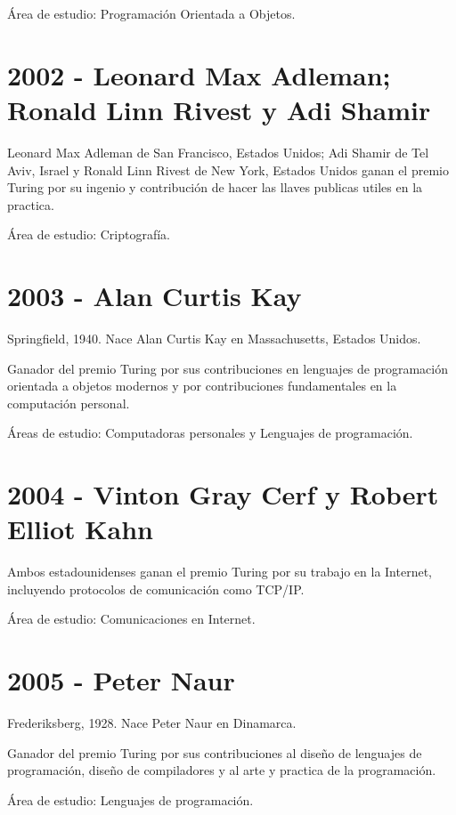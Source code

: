 \documentclass[notitlepage,letterpaper, 11pt]{article}
\begin{document}
\noindent Área de estudio: Programación Orientada a Objetos.
\newline

\section*{2002 - Leonard Max Adleman; Ronald Linn Rivest y Adi Shamir}
\noindent Leonard Max Adleman de San Francisco, Estados Unidos; Adi Shamir de Tel Aviv, Israel y  Ronald Linn Rivest de New York, Estados Unidos  ganan el premio Turing por su ingenio y contribución de hacer las llaves publicas utiles en la practica.

\noindent Área de estudio: Criptografía.
\newline

\section*{2003 - Alan Curtis Kay}
\noindent Springfield, 1940. Nace Alan Curtis Kay en Massachusetts, Estados Unidos.

\noindent Ganador del premio Turing por sus contribuciones en lenguajes de programación orientada a objetos modernos y por contribuciones fundamentales en la computación personal.

\noindent Áreas de estudio: Computadoras personales y Lenguajes de programación.
\newline

\section*{2004 - Vinton Gray Cerf y Robert Elliot Kahn}
\noindent Ambos estadounidenses  ganan el premio Turing por su trabajo en la Internet, incluyendo protocolos de comunicación como TCP/IP.

\noindent Área de estudio: Comunicaciones en Internet.
\newline

\section*{2005 - Peter Naur}
\noindent Frederiksberg, 1928. Nace Peter Naur en Dinamarca.

\noindent Ganador del premio Turing por sus contribuciones al diseño de lenguajes de programación, diseño de compiladores y al arte y practica de la programación.

\noindent Área de estudio: Lenguajes de programación.
\end{document}
